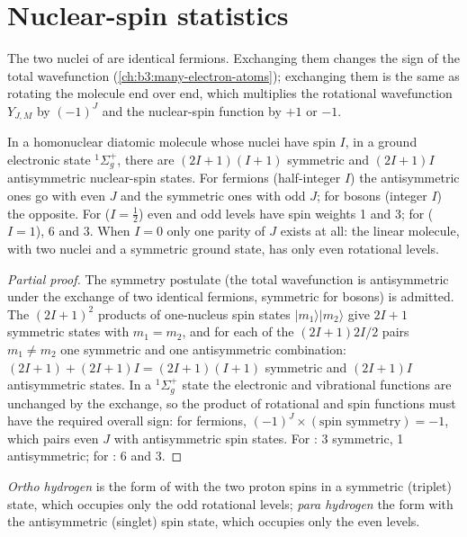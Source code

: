 \section{Nuclear-spin statistics}

The two nuclei of  are identical fermions. Exchanging them changes the sign
of the total wavefunction (\cref{ch:b3:many-electron-atoms}); exchanging them is
the same as rotating the molecule end over end, which multiplies the rotational
wavefunction $Y_{J,M}$ by $(-1)^J$ and the nuclear-spin function by $+1$ or $-1$.

\begin{theorem}\label{thm:b3:statistical-thermo-applied:spin-statistics}
In a homonuclear diatomic molecule whose nuclei have spin $I$, in a ground
electronic state ${}^1\Sigma_g^+$, there are $(2I+1)(I+1)$ symmetric and $(2I+1)I$
antisymmetric nuclear-spin states. For fermions (half-integer $I$) the
antisymmetric ones go with even $J$ and the symmetric ones with odd $J$; for
bosons (integer $I$) the opposite. For  ($I = \frac12$) even and odd levels have
spin weights 1 and 3; for  ($I = 1$), 6 and 3. When $I = 0$ only one parity of
$J$ exists at all: the linear  molecule, with two  nuclei and a
symmetric ground state, has only even rotational levels.
\end{theorem}

\begin{proof}[Partial proof]
The symmetry postulate (the total wavefunction is antisymmetric under the
exchange of two identical fermions, symmetric for bosons) is admitted. The
$(2I+1)^2$ products of one-nucleus spin states $|m_1\rangle|m_2\rangle$ give $2I+1$ symmetric
states with $m_1 = m_2$, and for each of the $(2I+1)2I/2$ pairs $m_1 \ne m_2$ one
symmetric and one antisymmetric combination: $(2I+1) + (2I+1)I = (2I+1)(I+1)$
symmetric and $(2I+1)I$ antisymmetric states. In a ${}^1\Sigma_g^+$ state the electronic
and vibrational functions are unchanged by the exchange, so the product of
rotational and spin functions must have the required overall sign: for
fermions, $(-1)^J \times(\text{spin symmetry}) = -1$, which pairs even $J$ with
antisymmetric spin states. For : 3 symmetric, 1 antisymmetric; for : 6 and
3.
\end{proof}

\begin{definition}\label{def:b3:statistical-thermo-applied:spin-isomers}
\emph{Ortho hydrogen} is the form of  with the two
proton spins in a symmetric (triplet) state, which occupies only the odd
rotational levels; \emph{para hydrogen} the form with the
antisymmetric (singlet) spin state, which occupies only the even levels.
\end{definition}

